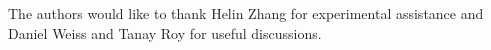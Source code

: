 \begin{acknowledgments}
  The authors would like to thank Helin Zhang for experimental assistance
  and Daniel Weiss and Tanay Roy for useful discussions.
\end{acknowledgments}
